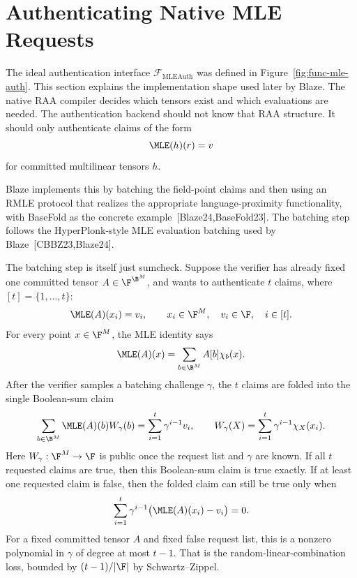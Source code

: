 \section{Authenticating Native MLE Requests}

The ideal authentication interface \(\mathcal F_{\mathrm{MLEAuth}}\) was defined
in Figure~\ref{fig:func-mle-auth}.  This section explains the implementation
shape used later by Blaze.  The native RAA compiler decides which tensors exist
and which evaluations are needed.  The authentication backend should not know
that RAA structure.  It should only authenticate claims of the form
\[
  \MLE(h)(r)=v
\]
for committed multilinear tensors \(h\).

Blaze implements this by batching the field-point claims and then using an RMLE
protocol that realizes the appropriate language-proximity functionality, with
BaseFold as the concrete example~[Blaze24,BaseFold23].  The batching step
follows the HyperPlonk-style MLE evaluation batching used by
Blaze~[CBBZ23,Blaze24].

The batching step is itself just sumcheck.  Suppose the verifier has already
fixed one committed tensor \(A\in\F^{\B^M}\), and wants to authenticate \(t\)
claims, where \([t]=\{1,\ldots,t\}\):
\[
  \MLE(A)(x_i)=v_i,
  \qquad x_i\in\F^M,\quad v_i\in\F,\quad i\in[t].
\]
For every point \(x\in\F^M\), the MLE identity says
\[
  \MLE(A)(x)=\sum_{b\in\B^M}A[b]\chi_b(x).
\]
After the verifier samples a batching challenge \(\gamma\), the \(t\) claims
are folded into the single Boolean-sum claim
\[
  \sum_{b\in\B^M}\MLE(A)(b)W_\gamma(b)
  =
  \sum_{i=1}^t\gamma^{i-1}v_i,
  \qquad
  W_\gamma(X)=\sum_{i=1}^t\gamma^{i-1}\chi_X(x_i).
\]
Here \(W_\gamma:\F^M\to\F\) is public once the request list and \(\gamma\) are
known.  If all \(t\) requested claims are true, then this Boolean-sum claim is
true exactly.  If at least one requested claim is false, then the folded claim
can still be true only when
\[
  \sum_{i=1}^t \gamma^{i-1}\bigl(\MLE(A)(x_i)-v_i\bigr)=0.
\]
For a fixed committed tensor \(A\) and fixed false request list, this is a
nonzero polynomial in \(\gamma\) of degree at most \(t-1\).  That is the
random-linear-combination loss, bounded by \((t-1)/|\F|\) by
Schwartz--Zippel.

